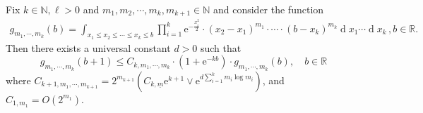 \documentclass[10pt,a4paper]{amsart}
\newcommand{\N}{\ensuremath{\mathbb{N}}}
\newcommand{\R}{\ensuremath{\mathbb{R}}}
\newcommand{\diff}{\ensuremath{\operatorname{d}\!}}
\begin{document}
\begin{lemma}\label{lemma: difference bound} Fix $k\in \N, \ell> 0$ and $m_1, m_2, \cdots, m_k, m_{k+1} \in \N$ and consider the function
\begin{align*}
g_{m_1, \cdots, m_k}(b) = \displaystyle\int_{x_1\le x_2\le \cdots\le x_k\le b}\prod_{i=1}^{k}\mathrm{e}^{-\frac{x_i^2}{2}}\cdot(x_2-x_1)^{m_1}\cdot \cdots \cdot (b-x_k)^{m_k}\diff x_1\cdots \diff x_{k}\,, b\in \R.
\end{align*}
Then there exists a universal constant $d>0$ such that 
    $$
     g_{m_1, \cdots, m_k}(b+1)\le C_{k, m_1, \cdots, m_k} \cdot (1+\mathrm{e}^{-kb})\cdot g_{m_1, \cdots, m_k}(b), \quad b\in \R
    $$
    where $C_{k+1, m_1, \cdots, m_{k+1}} = 2^{m_{k+1}}(C_{k,\underline{m}}\mathrm{e}^{k+1}\lor \mathrm{e}^{d\sum_{i=1}^k m_i\log m_i})$, and $C_{1,m_1} = O(2^{m_1})$.
\end{lemma}
\end{document}
